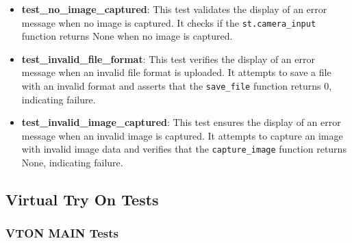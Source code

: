 \begin{itemize}
    \item \textbf{test\_no\_image\_captured}: This test validates the display of an error message when no image is captured. It checks if the \texttt{st.camera\_input} function returns None when no image is captured.
        
    \item \textbf{test\_invalid\_file\_format}: This test verifies the display of an error message when an invalid file format is uploaded. It attempts to save a file with an invalid format and asserts that the \texttt{save\_file} function returns 0, indicating failure.
        
    \item \textbf{test\_invalid\_image\_captured}: This test ensures the display of an error message when an invalid image is captured. It attempts to capture an image with invalid image data and verifies that the \texttt{capture\_image} function returns None, indicating failure.
    
\end{itemize}

    \subsection{Virtual Try On Tests}
    
    \subsubsection{VTON MAIN Tests}

